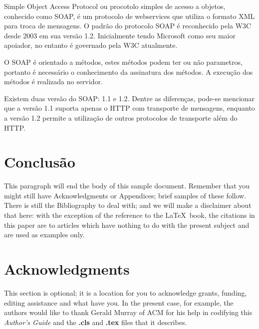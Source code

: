 \documentclass{acm_proc_article-sp}
\begin{document}
		Simple Object Access Protocol ou procotolo simples de acesso a objetos, conhecido como SOAP, é um protocolo de webservices que utiliza o formato XML para troca de mensagens. O padrão do protocolo SOAP é reconhecido pela W3C desde 2003 em sua versão 1.2. Inicialmente tendo Microsoft como seu maior apoiador, no entanto é governado pela W3C atualmente.
	
		O SOAP é orientado a métodos, estes métodos podem ter ou não parametros, portanto é necessário o conhecimento da assinatura dos métodos. A execução dos métodos é realizada no servidor.
		
		Existem duas versão do SOAP: 1.1 e 1.2. Dentre as diferenças, pode-se mencionar que a versão 1.1 suporta apenas o HTTP com transporte de mensagens, enquanto a versão 1.2 permite a utilização de outros protocolos de transporte além do HTTP.
 

\section{Conclusão}
This paragraph will end the body of this sample document.
Remember that you might still have Acknowledgments or
Appendices; brief samples of these
follow.  There is still the Bibliography to deal with; and
we will make a disclaimer about that here: with the exception
of the reference to the \LaTeX\ book, the citations in
this paper are to articles which have nothing to
do with the present subject and are used as
examples only.

\section{Acknowledgments}
This section is optional; it is a location for you
to acknowledge grants, funding, editing assistance and
what have you.  In the present case, for example, the
authors would like to thank Gerald Murray of ACM for
his help in codifying this \textit{Author's Guide}
and the \textbf{.cls} and \textbf{.tex} files that it describes.

%

%
%
\appendix
\end{document}

